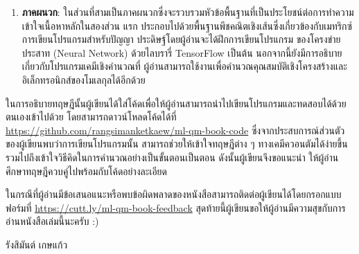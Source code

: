 {\begin{enumerate}[topsep=0pt]
    \item \textbf{ภาคผนวก}: ในส่วนที่สามเป็นภาคผนวกซึ่งจะรวบรวมหัวข้อพื้นฐานที่เป็นประโยชน์ต่อการทำความเข้าใจเนื้อหาหลักในสองส่วน%
    แรก ประกอบไปด้วยพื้นฐานพีชคณิตเชิงเส้นซึ่งเกี่ยวข้องกับเมทริกซ์ การเขียนโปรแกรมสำหรับปัญญา ประดิษฐ์โดยผู้อ่านจะได้ฝึกการเขียนโปรแกรม%
    ของโครงข่ายประสาท (Neural Network) ด้วยไลบรารี่ TensorFlow เป็นต้น นอกจากนี้ยังมีการอธิบายเกี่ยวกับโปรแกรมเคมีเชิงคำนวณที่%
    ผู้อ่านสามารถใช้งานเพื่อคำนวณคุณสมบัติเชิงโครงสร้างและอิเล็กทรอนิกส์ของโมเลกุลได้อีกด้วย
\end{enumerate}

ในการอธิบายทฤษฎีนั้นผู้เขียนได้ใส่โค้ดเพื่อให้ผู้อ่านสามารถนำไปเขียนโปรแกรมและทดสอบได้ด้วยตนเองเข้าไปด้วย โดยสามารถดาวน์โหลดโค้ดได้ที่ 
\url{https://github.com/rangsimanketkaew/ml-qm-book-code} ซึ่งจากประสบการณ์ส่วนตัวของผู้เขียนพบว่าการเขียนโปรแกรมนั้น%
สามารถช่วยให้เข้าใจทฤษฎีต่าง ๆ ทางเคมีควอนตัมได้ง่ายขึ้น รวมไปถึงเข้าใจวิธีคิดในการคำนวณอย่างเป็นขั้นตอนเป็นตอน ดังนั้นผู้เขียนจึงขอแนะนำ%
ให้ผู้อ่านศึกษาทฤษฎีควบคู่ไปพร้อมกับโค้ดอย่างละเอียด

ในกรณีที่ผู้อ่านมีข้อเสนอแนะหรือพบข้อผิดพลาดของหนังสือสามารถติดต่อผู้เขียนได้โดยกรอกแบบฟอร์มที่ 
\url{https://cutt.ly/ml-qm-book-feedback} สุดท้ายนี้ผู้เขียนขอให้ผู้อ่านมีความสุขกับการอ่านหนังสือเล่มนี้นะครับ :)

\medskip

\begin{flushright}
รังสิมันต์ เกษแก้ว
\end{flushright}
}
